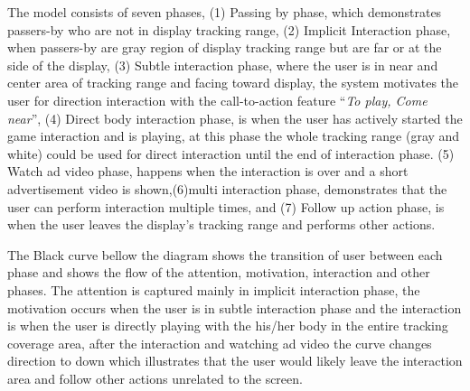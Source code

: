 The model consists of seven phases, (1) Passing by phase, which demonstrates passers-by who are not in display tracking range, (2) Implicit Interaction phase, when passers-by are gray region of display tracking range but are far or at the side of the display, (3) Subtle interaction phase, where the user is in near and center area of tracking range and facing toward display, the system motivates the user for direction interaction with the call-to-action feature ``\emph{To play, Come near}'', (4) Direct body interaction phase, is when the user has actively started the game interaction and is playing, at this phase the whole tracking range (gray and white) could be used for direct interaction until the end of interaction phase. (5) Watch ad video phase, happens when the interaction is over and a short advertisement video is shown,(6)multi interaction phase, demonstrates that the user can perform interaction multiple times, and (7) Follow up action phase, is when the user leaves the display’s tracking range and performs other actions.

The Black curve bellow the diagram shows the transition of user between each phase and shows the flow of the attention, motivation, interaction and other phases. The attention is captured mainly in implicit interaction phase, the motivation occurs when the user is in subtle interaction phase and the interaction is when the user is directly playing with the his/her body in the entire tracking coverage area, after the interaction and watching ad video the curve changes direction to down which illustrates that the user would likely leave the interaction area and follow other actions unrelated to the screen. 


